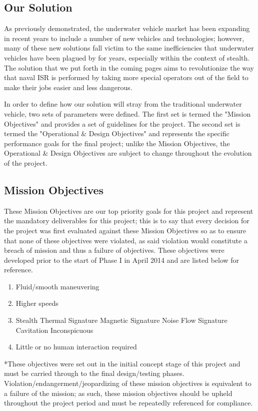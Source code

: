 \documentclass{report}
\begin{document}
\subsection{Our Solution}
As previously demonstrated, the underwater vehicle market has been expanding in recent years to include a number of new vehicles and technologies; however, many of these new solutions fall victim to the same inefficiencies that underwater vehicles have been plagued by for years, especially within the context of stealth.  The solution that we put forth in the coming pages aims to revolutionize the way that naval ISR is performed by taking more special operators out of the field to make their jobs easier and less dangerous.\par
In order to define how our solution will stray from the traditional underwater vehicle, two sets of parameters were defined.  The first set is termed the "Mission Objectives" and provides a set of guidelines for the project.  The second set is termed the "Operational \& Design Objectives" and represents the specific performance goals for the final project; unlike the Mission Objectives, the Operational \& Design Objectives are subject to change throughout the evolution of the project. \par
\subsection{Mission Objectives}
These Mission Objectives are our top priority goals for this project and represent the mandatory deliverables for this project; this is to say that every decision for the project was first evaluated against these Mission Objectives so as to ensure that none of these objectives were violated, as said violation would constitute a breach of mission and thus a failure of objectives.  These objectives were developed prior to the start of Phase I in April 2014 and are listed below for reference.
\begin{enumerate}
\item Fluid/smooth maneuvering
\item Higher speeds
\item Stealth
\subitem Thermal Signature
\subitem Magnetic Signature
\subitem Noise
\subitem Flow Signature
\subitem Cavitation
\subitem Inconspicuous
\item Little or no human interaction required
\end{enumerate} 
*These objectives were set out in the initial concept stage of this project and must be carried through to the final design/testing phases.  Violation/endangerment/jeopardizing of these mission objectives is equivalent to a failure of the mission; as such, these mission objectives should be upheld throughout the project period and must be repeatedly referenced for compliance.\par
\end{document}
